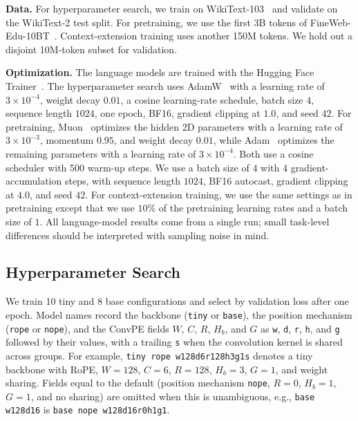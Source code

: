 \documentclass{article}
\begin{document}
\textbf{Data.} For hyperparameter search, we train on WikiText-103~\cite{merity2016pointer} and validate on the WikiText-2 test split. For pretraining, we use the first 3B tokens of FineWeb-Edu-10BT~\cite{penedo2024fineweb}. Context-extension training uses another 150M tokens. We hold out a disjoint 10M-token subset for validation.

\textbf{Optimization.} The language models are trained with the Hugging Face Trainer~\cite{wolf2020transformers}. The hyperparameter search uses AdamW~\cite{loshchilov2019decoupled} with a learning rate of $3\times10^{-4}$, weight decay $0.01$, a cosine learning-rate schedule, batch size $4$, sequence length $1024$, one epoch, BF16, gradient clipping at $1.0$, and seed $42$. For pretraining, Muon~\cite{jordan2024muon} optimizes the hidden 2D parameters with a learning rate of $3\times10^{-3}$, momentum $0.95$, and weight decay $0.01$, while Adam~\cite{DBLP:journals/corr/KingmaB14} optimizes the remaining parameters with a learning rate of $3\times10^{-4}$. Both use a cosine scheduler with 500 warm-up steps. We use a batch size of $4$ with $4$ gradient-accumulation steps, with sequence length $1024$, BF16 autocast, gradient clipping at $4.0$, and seed $42$. For context-extension training, we use the same settings as in pretraining except that we use $10\%$ of the pretraining learning rates and a batch size of $1$. All language-model results come from a single run; small task-level differences should be interpreted with sampling noise in mind.

\subsection{Hyperparameter Search}
\label{sec:hp}

We train 10 tiny and 8 base configurations and select by validation loss after one epoch. Model names record the backbone (\texttt{tiny} or \texttt{base}), the position mechanism (\texttt{rope} or \texttt{nope}), and the ConvPE fields $W$, $C$, $R$, $H_b$, and $G$ as \texttt{w}, \texttt{d}, \texttt{r}, \texttt{h}, and \texttt{g} followed by their values, with a trailing \texttt{s} when the convolution kernel is shared across groups. For example, \texttt{tiny rope w128d6r128h3g1s} denotes a tiny backbone with RoPE, $W=128$, $C=6$, $R=128$, $H_b=3$, $G=1$, and weight sharing. Fields equal to the default (position mechanism \texttt{nope}, $R=0$, $H_b=1$, $G=1$, and no sharing) are omitted when this is unambiguous, e.g., \texttt{base w128d16} is \texttt{base nope w128d16r0h1g1}.
\end{document}
